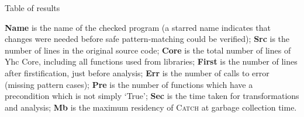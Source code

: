 \documentclass[preprint]{sigplanconf}
\newcommand{\C}[1]{\textsf{#1}}
\newcommand{\catch}{\textsc{Catch}}
\begin{document}
\begin{table}
\caption{Table of results}
\label{tab:results}

\smallskip

\textbf{Name} is the name of the checked program (a starred name indicates that changes were needed before safe pattern-matching could be verified);
\textbf{Src} is the number of lines in the original source code;
\textbf{Core} is the total number of lines of Yhc Core, including all functions used from libraries;
\textbf{First} is the number of lines after firstification, just before analysis;
\textbf{Err} is the number of calls to \C{error} (missing pattern cases);
\textbf{Pre} is the number of functions which have a precondition which is not simply `True';
\textbf{Sec} is the time taken for transformations and analysis;
\textbf{Mb} is the maximum residency of \catch{} at garbage collection time.

\smallskip\smallskip


\end{table}
\end{document}
